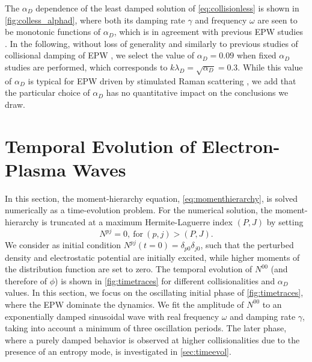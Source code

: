 The $\alpha_D$ dependence of the least damped solution of \cref{eq:collisionless} is shown in \cref{fig:colless_alphad}, where both its damping rate $\gamma$ and frequency $\omega$ are seen to be monotonic functions of $\alpha_D$, which is in agreement with previous EPW studies \citep{Banks2017}.
%
In the following, without loss of generality and similarly to previous studies of collisional damping of EPW \citep{Banks2016,Banks2017}, we select the value of $\alpha_D=0.09$ when fixed $\alpha_D$ studies are performed, which corresponds to $k \lambda_D = \sqrt{\alpha_D}=0.3$.
%
{While} this {value of} $\alpha_D$ is typical for EPW driven by stimulated Raman scattering \citep{Brunner2004,Winjum2013}{, we add that the particular choice of $\alpha_D$ has no quantitative impact on the conclusions we draw.}

\section{Temporal Evolution of Electron-Plasma Waves}
\label{sec:simresults}

In this section, the moment-hierarchy equation, \cref{eq:momenthierarchy}, is solved numerically as a time-evolution problem.
%
For the numerical solution, the moment-hierarchy is truncated at a maximum Hermite-Laguerre index $(P,J)$ by setting
%
\begin{equation}
    N^{pj}=0,~\text{for}~(p,j)>(P,J).
\label{eq:trunc}
\end{equation}
%
We consider as initial condition $N^{pj}(t=0)=\delta_{p0}\delta_{j0}$, such that the perturbed density and electrostatic potential are initially excited, while higher moments of the distribution function are set to zero.
%
The temporal evolution of $N^{00}$ (and therefore of $\phi$) is shown in \cref{fig:timetraces} {for different collisionalities and $\alpha_D$ values}.
%
In this section, we focus on {the} oscillating initial phase {of \cref{fig:timetraces}}, where the EPW dominate the dynamics.
%
We fit the amplitude of $N^{00}$ to an exponentially damped sinusoidal wave with real frequency $\omega$ and damping rate $\gamma${, taking into account a minimum of three oscillation periods}.
%
The later phase, where a purely damped behavior {is observed} at higher collisionalities due to the presence of an entropy mode, is investigated in \cref{sec:timeevol}.

